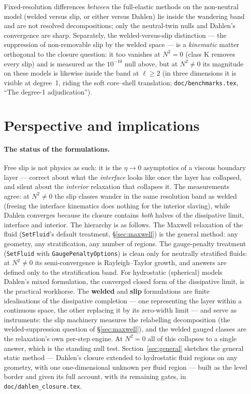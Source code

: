 \documentclass[11pt]{article}
\newcommand{\code}[1]{\texttt{#1}}
\begin{document}
\noindent
Fixed-resolution differences \emph{between} the full-elastic methods
on the non-neutral model (welded versus slip, or either versus
Dahlen) lie inside the wandering band and are not resolved
decompositions; only the neutral-twin nulls and Dahlen's convergence
are sharp. Separately, the welded-versus-slip distinction --- the
suppression of non-removable slip by the welded space --- is a
\emph{kinematic} matter orthogonal to the closure question: it too
vanishes at $N^2 = 0$ (class K removes every slip) and is measured as
the $10^{-10}$ null above, but at $N^2 \neq 0$ its magnitude on these
models is likewise inside the band at $\ell \ge 2$ (in three
dimensions it is visible at degree~1, riding the soft core--shell
translation; \code{doc/benchmarks.tex}, ``The degree-1
adjudication'').

\section{Perspective and implications}
\label{sec:persp}

\paragraph{The status of the formulations.} Free slip is not physics
as such: it is the $\eta \to 0$ asymptotics of a viscous boundary
layer --- correct about what the \emph{interface} looks like once
the layer has collapsed, and silent about the \emph{interior}
relaxation that collapses it. The measurements agree: at
$N^2 \ne 0$ the slip classes wander in the same resolution band as
welded (freeing the interface kinematics does nothing for the
interior slaving), while Dahlen converges because its closure
contains \emph{both} halves of the dissipative limit, interface and
interior. The hierarchy is as follows. The Maxwell relaxation of the
fluid (\code{SetFluid}'s default treatment, \S\ref{sec:maxwell}) is
the general method: any geometry, any stratification, any number of
regions. The gauge-penalty treatment (\code{SetFluid} with
\code{GaugePenaltyOptions}) is clean only for neutrally stratified
fluids: at $N^2 \neq 0$ its semi-convergence is Rayleigh--Taylor
growth, and answers are defined only to the stratification band. For
hydrostatic (spherical) models Dahlen's mixed formulation, the
converged closed form of the dissipative limit, is the practical
workhorse. The \textbf{welded} and \textbf{slip} formulations are
finite idealisations of the dissipative completion --- one
representing the layer within a continuous space, the other
replacing it by its zero-width limit --- and serve as instruments:
the slip machinery measures the relabelling decomposition (the
welded-suppression question of \S\ref{sec:maxwell}), and the
welded gauged classes are the relaxation's own per-step engine.
At $N^2 = 0$ all of this collapses to a single answer, which is the
standing null test. Section~\ref{sec:general} sketches the general
static method --- Dahlen's closure extended to hydrostatic fluid regions
on any geometry, with one one-dimensional unknown per fluid region ---
built as the level border and given its full account, with its
remaining gates, in \code{doc/dahlen\_closure.tex}.
\end{document}

